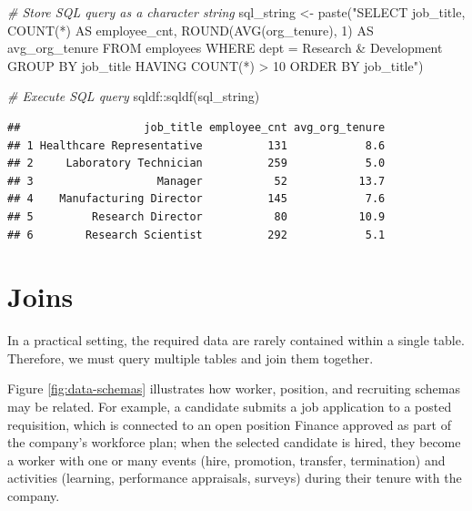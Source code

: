 \documentclass[
]{book}
\newenvironment{Shaded}{\begin{snugshade}}{\end{snugshade}}
\newcommand{\CommentTok}[1]{\textcolor[rgb]{0.56,0.35,0.01}{\textit{#1}}}
\newcommand{\FunctionTok}[1]{\textcolor[rgb]{0.00,0.00,0.00}{#1}}
\newcommand{\NormalTok}[1]{#1}
\newcommand{\OtherTok}[1]{\textcolor[rgb]{0.56,0.35,0.01}{#1}}
\newcommand{\SpecialCharTok}[1]{\textcolor[rgb]{0.00,0.00,0.00}{#1}}
\newcommand{\StringTok}[1]{\textcolor[rgb]{0.31,0.60,0.02}{#1}}
\begin{document}
\begin{Shaded}
\begin{Highlighting}[]
\CommentTok{\# Store SQL query as a character string}
\NormalTok{sql\_string }\OtherTok{\textless{}{-}} \FunctionTok{paste}\NormalTok{(}\StringTok{"SELECT}
\StringTok{                      job\_title,}
\StringTok{                      COUNT(*) AS employee\_cnt,}
\StringTok{                      ROUND(AVG(org\_tenure), 1) AS avg\_org\_tenure}
\StringTok{                    FROM}
\StringTok{                      employees}
\StringTok{                    WHERE}
\StringTok{                      dept = \textquotesingle{}Research \& Development\textquotesingle{}}
\StringTok{                    GROUP BY}
\StringTok{                      job\_title}
\StringTok{                    HAVING}
\StringTok{                      COUNT(*) \textgreater{} 10}
\StringTok{                    ORDER BY}
\StringTok{                      job\_title"}\NormalTok{)}

\CommentTok{\# Execute SQL query}
\NormalTok{sqldf}\SpecialCharTok{::}\FunctionTok{sqldf}\NormalTok{(sql\_string)}
\end{Highlighting}
\end{Shaded}

\begin{verbatim}
##                   job_title employee_cnt avg_org_tenure
## 1 Healthcare Representative          131            8.6
## 2     Laboratory Technician          259            5.0
## 3                   Manager           52           13.7
## 4    Manufacturing Director          145            7.6
## 5         Research Director           80           10.9
## 6        Research Scientist          292            5.1
\end{verbatim}

\hypertarget{joins}{%
\section{Joins}\label{joins}}

In a practical setting, the required data are rarely contained within a single table. Therefore, we must query multiple tables and join them together.

Figure \ref{fig:data-schemas} illustrates how worker, position, and recruiting schemas may be related. For example, a candidate submits a job application to a posted requisition, which is connected to an open position Finance approved as part of the company's workforce plan; when the selected candidate is hired, they become a worker with one or many events (hire, promotion, transfer, termination) and activities (learning, performance appraisals, surveys) during their tenure with the company.
\end{document}
